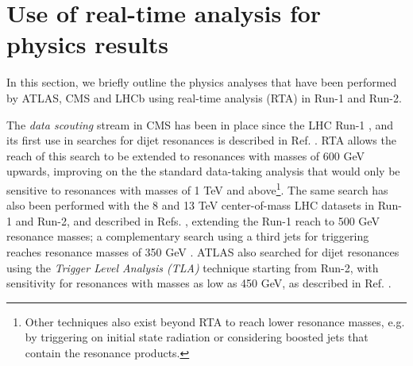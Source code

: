 \section{Use of real-time analysis for physics results}
\label{sec:RTA_physics}

In this section, we briefly outline the physics analyses that have been performed by ATLAS, CMS and LHCb using real-time analysis (RTA) in Run-1 and Run-2. 




The \textit{data scouting} stream in CMS has been in place since the LHC Run-1 \cite{CMS-DP-2012-022}, and its first use in searches for dijet resonances is described in Ref. \cite{CMS-PAS-EXO-11-094}. 
RTA allows the reach of this search to be extended to resonances with masses of 600 GeV upwards, improving on the the standard data-taking analysis that would only be sensitive to resonances with masses of 1 TeV and above\footnote{Other techniques also exist beyond RTA to reach lower resonance masses, e.g. by triggering on initial state radiation or considering boosted jets that contain the resonance products.}. The same search has also been performed with the 8 and 13 TeV center-of-mass LHC datasets in Run-1 and Run-2, and described in Refs. \cite{CMS:2016ltu, CMS:2016gsl, CMS:2018mgb}, extending the Run-1 reach to 500 GeV resonance masses; a complementary search using a third jets for triggering reaches resonance masses of 350 GeV \cite{CMS:2019mcu}. ATLAS also searched for dijet resonances using the \textit{Trigger Level Analysis (TLA)} technique starting from Run-2, with sensitivity for resonances with masses as low as 450 GeV, as described in Ref. \cite{ATLAS:2018qto}. 

